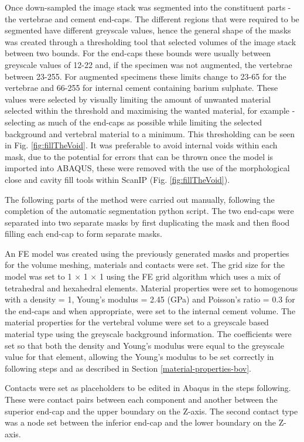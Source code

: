 Once down-sampled the image stack was segmented into the constituent
parts - the vertebrae and cement end-caps. The different regions that
were required to be segmented have different greyscale values, hence the
general shape of the masks was created through a thresholding tool that
selected volumes of the image stack between two bounds. For the end-caps
these bounds were usually between greyscale values of 12-22 and, if the
specimen was not augmented, the vertebrae between 23-255. For augmented
specimens these limits change to 23-65 for the vertebrae and 66-255 for
internal cement containing barium sulphate. These values were selected by visually limiting the amount of unwanted material selected within the threshold and maximising the wanted material, for example - selecting as much of the end-caps as possible while limiting the selected background and vertebral material to a minimum. This thresholding can be seen in Fig. \ref{fig:fillTheVoid}.
 It was preferable to avoid
internal voids within each mask, due to the potential for errors that
can be thrown once the model is imported into ABAQUS, these were
removed with the use of the morphological close and cavity fill tools within ScanIP (Fig. \ref{fig:fillTheVoid}).





The following parts of the method were carried out manually, following the completion of the automatic segmentation python script. The two end-caps were separated into two
separate masks by first duplicating the mask and then flood filling each end-cap to form separate masks.

An FE model was created using the previously generated masks and properties for the volume meshing, materials and contacts were set. The grid size for the model was set to 1 $\times$ 1 $\times$ 1 using the FE grid algorithm which uses a mix of tetrahedral and hexahedral elements. Material properties were set to homogenous with a density = 1, Young's modulus = 2.45 (GPa) and Poisson's ratio = 0.3 for the end-caps and when appropriate, were set to the internal cement volume. The material
properties for the vertebral volume were set to a greyscale based material type using the greyscale background information. The coefficients were set so that both the density and Young's modulus were equal to the greyscale value for that element, allowing the Young's modulus to be set correctly in following steps and as described in Section \ref{material-properties-bov}.

Contacts were set as placeholders to be edited in Abaqus in the steps following. These were contact pairs between each component and another between the superior end-cap and the upper boundary on the Z-axis. The second contact type was a node set between the inferior end-cap and the lower boundary on the Z-axis.

